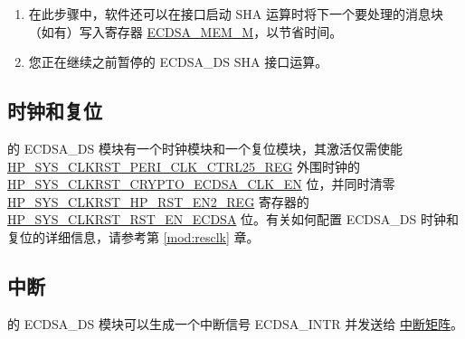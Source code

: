 \documentclass[main\_\_CN.tex]{subfiles}
\begin{document}
\begin{tiplisting}\label{others:ecdsa-note-sha}
\vspace{-2.5em}
\begin{enumerate}
\item 在此步骤中，软件还可以在接口启动 SHA 运算时将下一个要处理的消息块（如有）写入寄存器 \hyperref[tab:ecdsa-memory]{ECDSA\_MEM\_M}，以节省时间。
\item 您正在继续之前暂停的 ECDSA\_DS SHA 接口运算。
\end{enumerate}
\end{tiplisting}
\subsection{时钟和复位}

\chipname{} 的 ECDSA\_DS 模块有一个时钟模块和一个复位模块，其激活仅需使能 \hyperref[regdesc:HPSYSCLKRSTPERICLKCTRL25REG]{HP\_SYS\_CLKRST\_PERI\_CLK\_CTRL25\_REG} 外围时钟的 \hyperref[fielddesc:HPSYSCLKRSTCRYPTOECDSACLKEN]{HP\_SYS\_CLKRST\_CRYPTO\_ECDSA\_CLK\_EN} 位，并同时清零 \hyperref[regdesc:HPSYSCLKRSTHPRSTEN2REG]{HP\_SYS\_CLKRST\_HP\_RST\_EN2\_REG} 寄存器的 \hyperref[fielddesc:HPSYSCLKRSTRSTENECDSA]{HP\_SYS\_CLKRST\_RST\_EN\_ECDSA} 位。有关如何配置 ECDSA\_DS 时钟和复位的详细信息，请参考第 \ref{mod:resclk} 章\textit{}。

\subsection{中断}
\label{sec:ecdsa-interrupt}

\chipname{} 的 ECDSA\_DS 模块可以生成一个中断信号 ECDSA\_INTR 并发送给 \hyperref[mod:intmtrx]{中断矩阵}。
\end{document}
